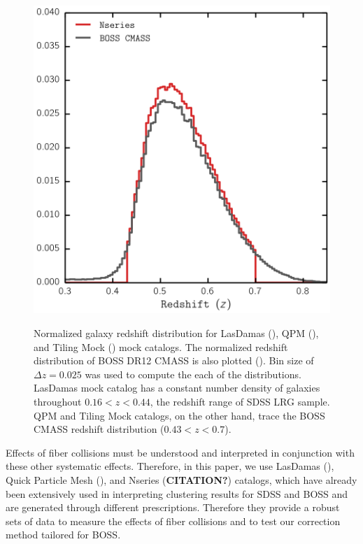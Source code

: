 \documentclass{emulateapj}
\begin{document}
\begin{figure}
\begin{center}
\includegraphics[scale=0.35]{mock_catalog_z_dist} \label{fig:zdist}
\caption{Normalized galaxy redshift distribution for LasDamas (\ldgcolor), QPM (\qpmcolor), and Tiling Mock (\tmcolor) mock catalogs. The normalized redshift distribution of BOSS DR12 CMASS is also plotted (\cmasscolor). Bin size of $\Delta z = 0.025$ was used to compute the each of the distributions. LasDamas mock catalog has a constant number density of galaxies throughout $0.16 < z < 0.44$, the redshift range of SDSS LRG sample. QPM and Tiling Mock catalogs, on the other hand, trace the BOSS CMASS redshift distribution ($0.43 < z < 0.7$).}
\end{center}
\end{figure}

Effects of fiber collisions must be understood and interpreted in conjunction with these other systematic effects. Therefore, in this paper, we use LasDamas (\citealt{McBride:2009aa, McBride:2011aa}), Quick Particle Mesh (\citealt{White:2014aa}), and Nseries ({\bf CITATION?}) catalogs, which have already been extensively used in interpreting clustering results for SDSS and BOSS and are generated through different prescriptions. Therefore they provide a robust sets of data to measure the effects of fiber collisions and to test our correction method tailored for BOSS. 
\end{document}
